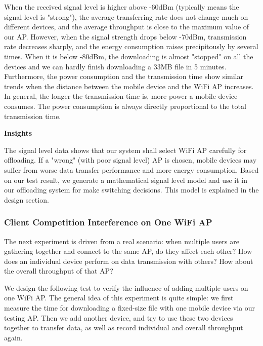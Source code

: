 \documentclass[english]{tktltiki}
\begin{document}
When the received signal level is higher above -60dBm (typically means the signal level is "strong"), the average transferring rate does not change much on different devices, and the average throughput is close to the maximum value of our AP. However, when the signal strength drops below -70dBm, transmission rate decreases sharply, and the energy consumption raises precipitously by several times. When it is below -80dBm, the downloading is almost "stopped" on all the devices and we can hardly finish downloading a 33MB file in 5 minutes. Furthermore, the power consumption and the transmission time show similar trends when the distance between the mobile device and the WiFi AP increases. In general, the longer the transmission time is, more power a mobile device consumes. The power consumption is always directly proportional to the total transmission time.

\vspace{1mm}

\textbf{Insights}

\vspace{1mm}

The signal level data shows that our system shall select WiFi AP carefully for offloading. If a "wrong" (with poor signal level) AP is chosen, mobile devices may suffer from worse data transfer performance and more energy consumption. Based on our test result, we generate a mathematical signal level model and use it in our offloading system for make switching decisions. This model is explained in the design section.


\subsubsection{Client Competition Interference on One WiFi AP}

The next experiment is driven from a real scenario: when multiple users are gathering together and connect to the same AP, do they affect each other? How does an individual device perform on data transmission with others? How about the overall throughput of that AP?

We design the following test to verify the influence of adding multiple users on one WiFi AP. The general idea of this experiment is quite simple: we first measure the time for downloading a fixed-size file with one mobile device via our testing AP. Then we add another device, and try to use these two devices together to transfer data, as well as record individual and overall throughput again.
\end{document}
